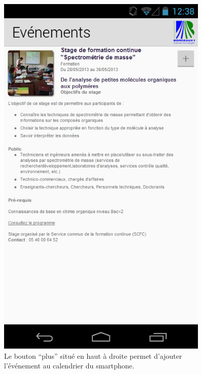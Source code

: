 \documentclass [pdftex,12pt] {report}
\begin{document}
\begin{figure}
\begin{minipage}[t]{8cm}
    \includegraphics[width=0.9\textwidth]{resources/ui_preview/04}
    \caption{Le bouton ``plus'' situé en haut à droite permet d'ajouter l’événement au calendrier du smartphone.}
    \label{fig:04}
  \end{minipage}
\end{figure}
\end{document}
